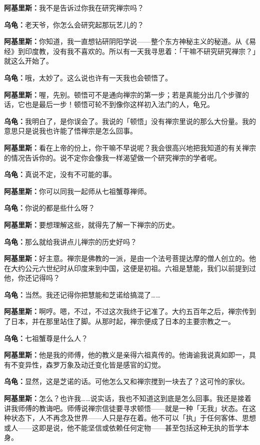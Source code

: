 \documentclass[
  12pt,
  twoside,
  openright,
  oldfontcommands,
]{memoir}
\newcommand{\dialogname}[1]{{\heifamily\bfseries #1}}
\begin{document}
\dialogname{阿基里斯：}我不是告诉过你我在研究禅宗吗？

\dialogname{乌龟：}老天爷，你怎么会研究起那玩艺儿的？

\dialogname{阿基里斯：}你知道，我一直想钻研阴阳学说------整个东方神秘主义的秘道。从《易经》到印度教，没有我不喜欢的。所以有一天我寻思着：「干嘛不研究研究禅宗？」就这么开始了。

\dialogname{乌龟：}哦，太妙了。这么说也许有一天我也会顿悟了。

\dialogname{阿基里斯：}喔，先别。顿悟可不是通向禅宗的第一步；若是真能分出几个步骤的话，它也是最后一步！顿悟可轮不到像你这样初入法门的人，龟兄。

\dialogname{乌龟：}我明白了，是你误会了。我说的「顿悟」没有禅宗里说的那么大份量。我的意思只是说我也许能了悟禅宗是怎么回事。

\dialogname{阿基里斯：}看在上帝的份上，你干嘛不早说呢？我会很高兴地把我知道的有关禅宗的情况告诉你的。说不定你会像我一样渴望做一个研究禅宗的学者呢。

\dialogname{乌龟：}真说不定，没有不可能的事。

\dialogname{阿基里斯：}你可以同我一起师从七祖蟹尊禅师。

\dialogname{乌龟：}你说的都是些什么呀？

\dialogname{阿基里斯：}要想理解这些，就得先了解一下禅宗的历史。

\dialogname{乌龟：}那么就给我讲点儿禅宗的历史好吗？

\dialogname{阿基里斯：}好主意。禅宗是佛教的一派，是由一个法号菩提达摩的僧人创立的。他在大约公元六世纪时从印度来到中国，这便是初祖。六祖是慧能，我们以前提到过他，你还记得吗？

\dialogname{乌龟：}当然。我还记得你把慧能和芝诺给搞混了\ldots\ldots{}

\dialogname{阿基里斯：}啊哼。嗯，不过，不过这次我终于记准了。大约五百年之后，禅宗传到了日本，并在那里站住了脚。从那时起，禅宗便成了日本的主要宗教之一。

\dialogname{乌龟：}七祖蟹尊是什么人？

\dialogname{阿基里斯：}他是我的师傅，他的教义是亲得六祖真传的。他诲谕我说真如即一，具有不变异性，森罗万象及动迁变化皆是感官的幻觉。

\dialogname{乌龟：}显然，这是芝诺的话。可他怎么又和禅宗搅到一块去了？这可怜的家伙。

\dialogname{阿基里斯：}怎么？也许我\ldots\ldots 说实话，我也不知道这到底是怎么回事。我还是接着讲我师傅的教诲吧。师傅说禅宗信徒要寻求顿悟------就是一种「无我」状态。在这种状态下，人不再念及世界------人只是存在着。他不可以「执」于任何客体、思想或人------这即是说，他不能坚信或依赖任何定物------甚至包括这种无执的哲学本身。
\end{document}
